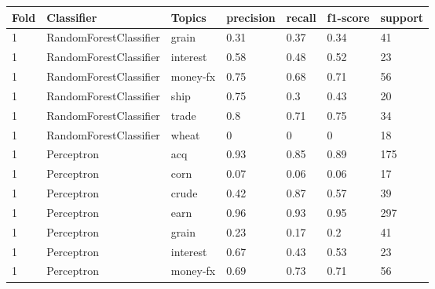 \documentclass{article}
\begin{document}
\begin{table}[h]
\begin{tabular}{lllllll}
\textbf{Fold} & \textbf{Classifier}    & \textbf{Topics} & \textbf{precision} & \textbf{recall} & \textbf{f1-score} & \textbf{support} \\ \hline
1             & RandomForestClassifier & grain           & 0.31               & 0.37            & 0.34              & 41               \\
1             & RandomForestClassifier & interest        & 0.58               & 0.48            & 0.52              & 23               \\
1             & RandomForestClassifier & money-fx        & 0.75               & 0.68            & 0.71              & 56               \\
1             & RandomForestClassifier & ship            & 0.75               & 0.3             & 0.43              & 20               \\
1             & RandomForestClassifier & trade           & 0.8                & 0.71            & 0.75              & 34               \\
1             & RandomForestClassifier & wheat           & 0                  & 0               & 0                 & 18               \\
1             & Perceptron             & acq             & 0.93               & 0.85            & 0.89              & 175              \\
1             & Perceptron             & corn            & 0.07               & 0.06            & 0.06              & 17               \\
1             & Perceptron             & crude           & 0.42               & 0.87            & 0.57              & 39               \\
1             & Perceptron             & earn            & 0.96               & 0.93            & 0.95              & 297              \\
1             & Perceptron             & grain           & 0.23               & 0.17            & 0.2               & 41               \\
1             & Perceptron             & interest        & 0.67               & 0.43            & 0.53              & 23               \\
1             & Perceptron             & money-fx        & 0.69               & 0.73            & 0.71              & 56               \\

\end{tabular}
\end{table}
\end{document}
